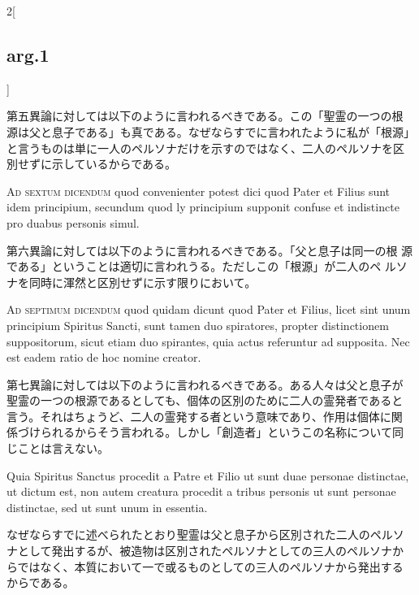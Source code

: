 \documentclass[paper=a4paper,fontsize=10pt,jafontsize=9pt,titlepage]{jlreq}
\begin{document}
\begin{paracol}{2}[\subsection{arg.1}]
\switchcolumn

第五異論に対しては以下のように言われるべきである。この「聖霊の一つの根
源は父と息子である」も真である。なぜならすでに言われたように私が「根源」
と言うものは単に一人のペルソナだけを示すのではなく、二人のペルソナを区
別せずに示しているからである。

\switchcolumn*[\subsection{ad.6}]

{\scshape Ad sextum dicendum} quod convenienter potest dici quod Pater et Filius
sunt idem principium, secundum quod ly principium supponit confuse et
indistincte pro duabus personis simul.

\switchcolumn

第六異論に対しては以下のように言われるべきである。「父と息子は同一の根
 源である」ということは適切に言われうる。ただしこの「根源」が二人のペ
 ルソナを同時に渾然と区別せずに示す限りにおいて。

\switchcolumn*[\subsection{ad.7}]

{\scshape Ad septimum dicendum} quod quidam dicunt quod Pater et Filius, licet
sint unum principium  Spiritus Sancti, sunt tamen duo spiratores,
propter distinctionem suppositorum, sicut etiam duo spirantes, quia
actus referuntur ad supposita. Nec est eadem ratio de hoc nomine
creator.

\switchcolumn

第七異論に対しては以下のように言われるべきである。ある人々は父と息子が
聖霊の一つの根源であるとしても、個体の区別のために二人の霊発者であると
言う。それはちょうど、二人の霊発する者という意味であり、作用は個体に関
係づけられるからそう言われる。しかし「創造者」というこの名称について同
じことは言えない。

\switchcolumn*

Quia Spiritus Sanctus procedit a Patre et Filio
ut sunt duae personae distinctae, ut dictum est, non autem creatura
procedit a tribus personis ut sunt personae distinctae, sed ut sunt
unum in essentia.

\switchcolumn

なぜならすでに述べられたとおり聖霊は父と息子から区別された二人のペルソ
ナとして発出するが、被造物は区別されたペルソナとしての三人のペルソナか
らではなく、本質において一で或るものとしての三人のペルソナから発出する
からである。


\end{paracol}
\end{document}
